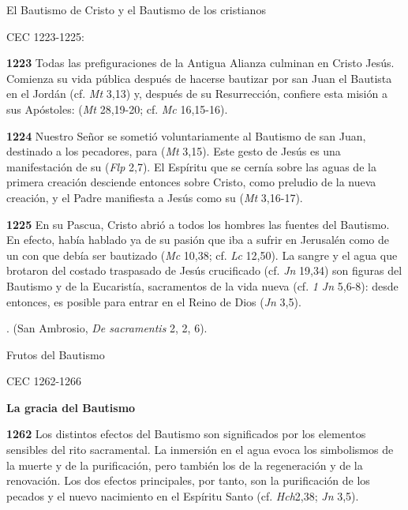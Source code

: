 \begin{body}
\begin{body}
{El Bautismo de Cristo y el Bautismo de los cristianos

CEC 1223-1225:

\textbf{1223} Todas las prefiguraciones de la Antigua Alianza culminan en Cristo Jesús. Comienza su vida pública después de hacerse bautizar por san Juan el Bautista en el Jordán (cf. \emph{Mt} 3,13) y, después de su Resurrección, confiere esta misión a sus Apóstoles:  (\emph{Mt} 28,19-20; cf. \emph{Mc} 16,15-16).

\textbf{1224} Nuestro Señor se sometió voluntariamente al Bautismo de san Juan, destinado a los pecadores, para  (\emph{Mt} 3,15). Este gesto de Jesús es una manifestación de su  (\emph{Flp} 2,7). El Espíritu que se cernía sobre las aguas de la primera creación desciende entonces sobre Cristo, como preludio de la nueva creación, y el Padre manifiesta a Jesús como su  (\emph{Mt} 3,16-17).

\textbf{1225} En su Pascua, Cristo abrió a todos los hombres las fuentes del Bautismo. En efecto, había hablado ya de su pasión que iba a sufrir en Jerusalén como de un  con que debía ser bautizado (\emph{Mc} 10,38; cf. \emph{Lc} 12,50). La sangre y el agua que brotaron del costado traspasado de Jesús crucificado (cf. \emph{Jn} 19,34) son figuras del Bautismo y de la Eucaristía, sacramentos de la vida nueva (cf. \emph{1 Jn} 5,6-8): desde entonces, es posible  para entrar en el Reino de Dios (\emph{Jn} 3,5).

. (San Ambrosio, \emph{De sacramentis} 2, 2, 6).

Frutos del Bautismo

CEC 1262-1266

\textbf{La gracia del Bautismo}

\textbf{1262} Los distintos efectos del Bautismo son significados por los elementos sensibles del rito sacramental. La inmersión en el agua evoca los simbolismos de la muerte y de la purificación, pero también los de la regeneración y de la renovación. Los dos efectos principales, por tanto, son la purificación de los pecados y el nuevo nacimiento en el Espíritu Santo (cf. \emph{Hch}2,38; \emph{Jn} 3,5).

}
\end{body}
\end{body}
